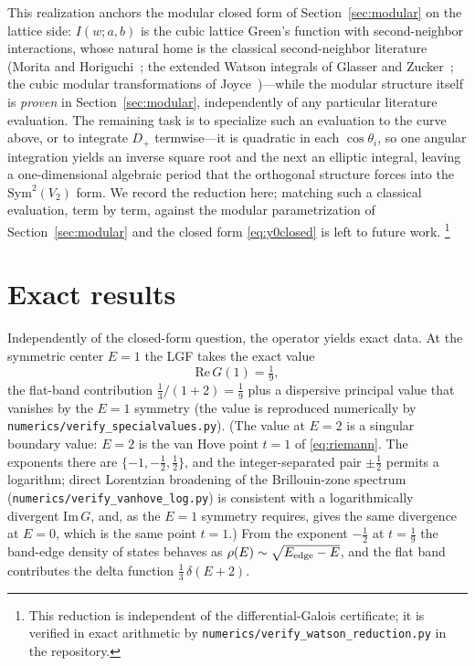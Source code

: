 \documentclass[11pt]{article}
\theoremstyle{plain}
\theoremstyle{remark}
\begin{document}
This realization anchors the modular closed form of Section~\ref{sec:modular} on the lattice side: $I(w;a,b)$ is
the cubic lattice Green's function with second-neighbor interactions, whose natural home is the classical
second-neighbor literature (Morita and Horiguchi~\cite{MoritaHoriguchi1971}; the extended Watson integrals of
Glasser and Zucker~\cite{GlasserZucker1977}; the cubic modular transformations of Joyce~\cite{Joyce1998})---while the modular structure itself is \emph{proven} in
Section~\ref{sec:modular}, independently of any particular literature evaluation. The remaining task is to specialize such an evaluation to the curve above, or to integrate
$D_+$ termwise---it is quadratic in each $\cos\theta_i$, so one angular integration yields an inverse square root
and the next an elliptic integral, leaving a one-dimensional algebraic period that the orthogonal structure forces
into the $\mathrm{Sym}^2(V_2)$ form. We record the reduction here; matching such a classical evaluation, term by
term, against the modular parametrization of Section~\ref{sec:modular} and the closed form \eqref{eq:y0closed} is
left to future work.%
\footnote{This reduction is independent of the differential-Galois certificate; it is verified in exact
arithmetic by \texttt{numerics/verify\_watson\_reduction.py} in the repository.}

\section{Exact results}
Independently of the closed-form question, the operator yields exact data. At the symmetric center $E=1$ the LGF
takes the exact value
\begin{equation}
\mathrm{Re}\,G(1)=\tfrac19,
\end{equation}
the flat-band contribution $\tfrac13/(1+2)=\tfrac19$ plus a dispersive principal value that vanishes by the
$E=1$ symmetry (the value is reproduced numerically by \texttt{numerics/verify\_specialvalues.py}). (The value at $E=2$ is a singular boundary value: $E=2$ is the van Hove point $t=1$ of
\eqref{eq:riemann}. The exponents there are $\{-1,-\tfrac12,\tfrac12\}$, and the integer-separated pair
$\pm\tfrac12$ permits a logarithm; direct Lorentzian broadening of the Brillouin-zone spectrum
(\texttt{numerics/verify\_vanhove\_log.py}) is consistent with a logarithmically divergent
$\mathrm{Im}\,G$, and, as the $E=1$ symmetry requires, gives the same divergence at $E=0$, which is the same
point $t=1$.) From the exponent $-\tfrac12$ at
$t=\tfrac19$ the band-edge density of states behaves as $\rho(E)\sim\sqrt{E_{\rm edge}-E}$, and the flat band
contributes the delta function $\tfrac13\,\delta(E+2)$.
\end{document}
